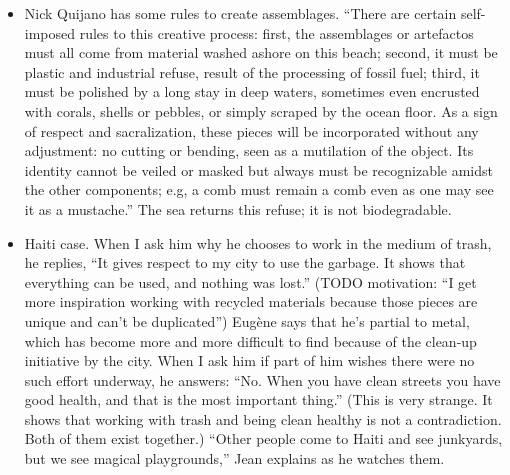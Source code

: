 \documentclass[12pt]{article}
\providecommand{\quotes}[1]{``#1''}
\begin{document}
\begin{itemize}

\item Nick Quijano has some rules to create assemblages. \quotes{There are certain self-imposed rules to this creative process: first, the assemblages or artefactos must all come from material washed ashore on this beach; second, it must be plastic and industrial refuse, result of the processing of fossil fuel; third, it must be polished by a long stay in deep waters, sometimes even encrusted with corals, shells or pebbles, or simply scraped by the ocean floor. As a sign of respect and sacralization, these pieces will be incorporated without any adjustment: no cutting or bending, seen as a mutilation of the object. Its identity cannot be veiled or masked but always must be recognizable amidst the other components; e.g, a comb must remain a comb even as one may see it as a mustache.} The sea returns this refuse; it is not biodegradable.


\item Haiti case. When I ask him why he chooses to work in the medium of trash, he replies, \quotes{It gives respect to my city to use the garbage. It shows that everything can be used, and nothing was lost.} (TODO motivation: \quotes{I get more inspiration working with recycled materials because those pieces are unique and can’t be duplicated}) Eugène says that he’s partial to metal, which has become more and more difficult to find because of the clean-up initiative by the city. When I ask him if part of him wishes there were no such effort underway, he answers: \quotes{No. When you have clean streets you have good health, and that is the most important thing.} (This is very strange. It shows that working with trash and being clean healthy is not a contradiction. Both of them exist together.) \quotes{Other people come to Haiti and see junkyards, but we see magical playgrounds,} Jean explains as he watches them.


\end{itemize}
\end{document}
